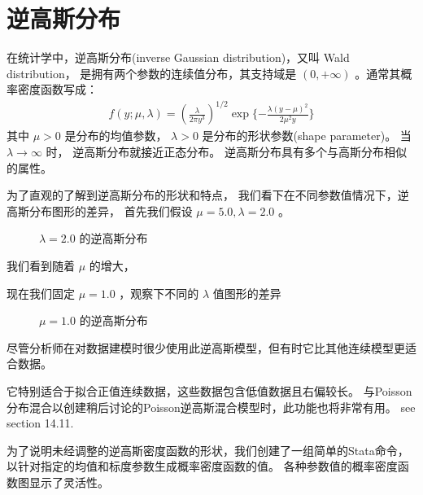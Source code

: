 \documentclass[letterpaper,10pt,english]{sphinxmanual}
\begin{document}
\section{逆高斯分布}
\label{\detokenize{_u9006_u9ad8_u65af_u6a21_u578b/content:id2}}
在统计学中，逆高斯分布(inverse Gaussian distribution)，又叫 Wald distribution，
是拥有两个参数的连续值分布，其支持域是 \((0,+\infty)\)
。通常其概率密度函数写成：
\begin{equation}\label{equation:逆高斯模型/content:逆高斯模型/content:0}
\begin{split}f(y;\mu,\lambda) = \left ( \frac{\lambda}{ 2\pi y^3 }  \right )^{1/2}
\exp \{  -\frac{\lambda(y-\mu)^2}{2 \mu^2 y } \}\end{split}
\end{equation}
其中 \(\mu>0\) 是分布的均值参数，
\(\lambda>0\) 是分布的形状参数(shape parameter)。
当 \(\lambda \to \infty\) 时，
逆高斯分布就接近正态分布。
逆高斯分布具有多个与高斯分布相似的属性。

为了直观的了解到逆高斯分布的形状和特点，
我们看下在不同参数值情况下，逆高斯分布图形的差异，
首先我们假设 \(\mu=5.0,\lambda=2.0\)
。

\begin{figure}[htbp]
\centering
\capstart

\noindent{}
\caption{\(\lambda=2.0\) 的逆高斯分布}\label{\detokenize{_u9006_u9ad8_u65af_u6a21_u578b/content:id8}}\end{figure}

我们看到随着 \(\mu\) 的增大，

现在我们固定 \(\mu=1.0\)
，观察下不同的 \(\lambda\) 值图形的差异

\begin{figure}[htbp]
\centering
\capstart

\noindent{}
\caption{\(\mu=1.0\) 的逆高斯分布}\label{\detokenize{_u9006_u9ad8_u65af_u6a21_u578b/content:id9}}\end{figure}

尽管分析师在对数据建模时很少使用此逆高斯模型，但有时它比其他连续模型更适合数据。

它特别适合于拟合正值连续数据，这些数据包含低值数据且右偏较长。
与Poisson分布混合以创建稍后讨论的Poisson逆高斯混合模型时，此功能也将非常有用。
see section 14.11.

为了说明未经调整的逆高斯密度函数的形状，我们创建了一组简单的Stata命令，以针对指定的均值和标度参数生成概率密度函数的值。
各种参数值的概率密度函数图显示了灵活性。
\end{document}
